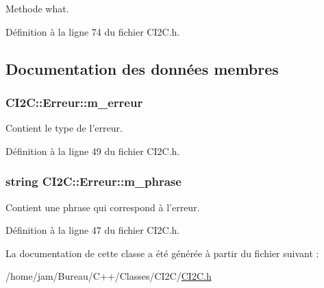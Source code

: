 Methode what. 



Définition à la ligne 74 du fichier C\+I2\+C.\+h.



\subsection{Documentation des données membres}
\hypertarget{class_c_i2_c_1_1_erreur_a0228754dfbaabca99985b8701fcd92b0}{
\subsubsection[{m\+\_\+erreur}]{ C\+I2\+C\+::\+Erreur\+::m\+\_\+erreur\hspace{0.3cm}{\ttfamily [private]}}}\label{class_c_i2_c_1_1_erreur_a0228754dfbaabca99985b8701fcd92b0}


Contient le type de l'erreur. 



Définition à la ligne 49 du fichier C\+I2\+C.\+h.

\hypertarget{class_c_i2_c_1_1_erreur_ac61872a33babfea899fa3f3feaedaf32}{
\subsubsection[{m\+\_\+phrase}]{\setlength{\rightskip}{0pt plus 5cm}string C\+I2\+C\+::\+Erreur\+::m\+\_\+phrase\hspace{0.3cm}{\ttfamily [private]}}}\label{class_c_i2_c_1_1_erreur_ac61872a33babfea899fa3f3feaedaf32}


Contient une phrase qui correspond à l'erreur. 



Définition à la ligne 47 du fichier C\+I2\+C.\+h.



La documentation de cette classe a été générée à partir du fichier suivant \+:\begin{DoxyCompactItemize}
\item 
/home/jam/\+Bureau/\+C++/\+Classes/\+C\+I2\+C/\hyperlink{_c_i2_c_8h}{C\+I2\+C.\+h}\end{DoxyCompactItemize}
